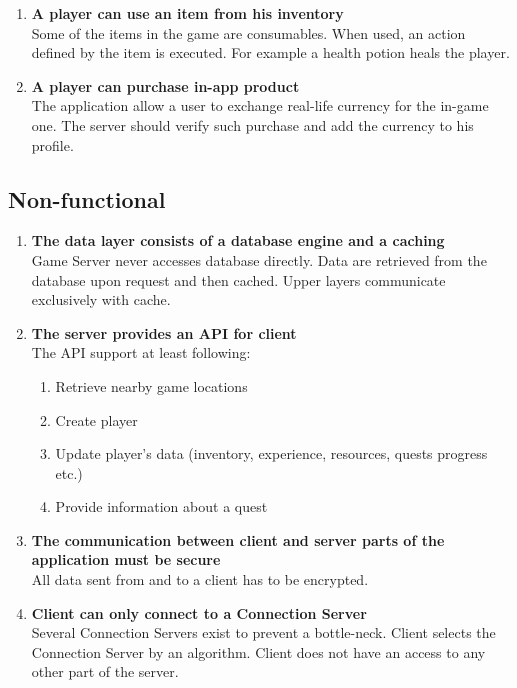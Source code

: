 \begin{enumerate}
			\item \textbf{A player can use an item from his inventory} \\
			Some of the items in the game are consumables. When used, an action defined by the item is executed. For example a health potion heals the player.
			
			\item \textbf{A player can purchase in-app product} \\
			The application allow a user to exchange real-life currency for the in-game one. The server should verify such purchase and add the currency to his profile.
			
		\end{enumerate}
		
		
	\subsection{Non-functional}
	
		\begin{enumerate}
			\item \textbf{The data layer consists of a database engine and a caching} \\
			Game Server never accesses database directly. Data are retrieved from the database upon request and then cached. Upper layers communicate exclusively with cache.		
			
			\item \textbf{The server provides an API for client} \\
			The API support at least following:
			\begin{enumerate}
				\item Retrieve nearby game locations
				\item Create player
				\item Update player's data (inventory, experience, resources, quests progress etc.)
				\item Provide information about a quest 			
			\end{enumerate}
			
			\item \textbf{The communication between client and server parts of the application must be secure} \\
			All data sent from and to a client has to be encrypted.
	
			\item \textbf{Client can only connect to a Connection Server} \\
			Several Connection Servers exist to prevent a bottle-neck. Client selects the Connection Server by an algorithm. Client does not have an access to any other part of the server.
		\end{enumerate}

